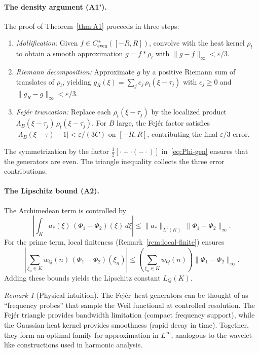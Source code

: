 \documentclass[11pt,a4paper]{article}
\theoremstyle{definition}
\theoremstyle{remark}
\newtheorem{remark}[theorem]{Remark}
\begin{document}
\paragraph{The density argument (A1').}
The proof of Theorem~\ref{thm:A1} proceeds in three steps:
\begin{enumerate}
\item \emph{Mollification:} Given $f \in C^+_{\mathrm{even}}([-R,R])$, convolve with the heat kernel $\rho_t$ to obtain a smooth approximation $g = f * \rho_t$ with $\|g - f\|_\infty < \varepsilon/3$.

\item \emph{Riemann decomposition:} Approximate $g$ by a positive Riemann sum of translates of $\rho_t$, yielding $g_R(\xi) = \sum_j c_j\, \rho_t(\xi - \tau_j)$ with $c_j \geq 0$ and $\|g_R - g\|_\infty < \varepsilon/3$.

\item \emph{Fej\'er truncation:} Replace each $\rho_t(\xi - \tau_j)$ by the localized product $\Lambda_B(\xi - \tau_j)\, \rho_t(\xi - \tau_j)$. For $B$ large, the Fej\'er factor satisfies $|\Lambda_B(\xi - \tau) - 1| < \varepsilon/(3C)$ on $[-R,R]$, contributing the final $\varepsilon/3$ error.
\end{enumerate}
The symmetrization by the factor $\frac{1}{2}[\cdot + \cdot(-\cdot)]$ in~\eqref{eq:Phi-gen} ensures that the generators are even. The triangle inequality collects the three error contributions.

\paragraph{The Lipschitz bound (A2).}
The Archimedean term is controlled by
\[
  \left|\int_K a_*(\xi)\, (\Phi_1 - \Phi_2)(\xi)\, d\xi\right| \leq \|a_*\|_{L^1(K)}\, \|\Phi_1 - \Phi_2\|_\infty.
\]
For the prime term, local finiteness (Remark~\ref{rem:local-finite}) ensures
\[
  \left|\sum_{\xi_n \in K} w_Q(n)\, (\Phi_1 - \Phi_2)(\xi_n)\right| \leq \left(\sum_{\xi_n \in K} w_Q(n)\right) \|\Phi_1 - \Phi_2\|_\infty.
\]
Adding these bounds yields the Lipschitz constant $L_Q(K)$.

\begin{remark}[Physical intuition]\label{rem:physics}
The Fej\'er--heat generators can be thought of as ``frequency probes'' that sample the Weil functional at controlled resolution. The Fej\'er triangle provides bandwidth limitation (compact frequency support), while the Gaussian heat kernel provides smoothness (rapid decay in time). Together, they form an optimal family for approximation in $L^\infty$, analogous to the wavelet-like constructions used in harmonic analysis.
\end{remark}
\end{document}
